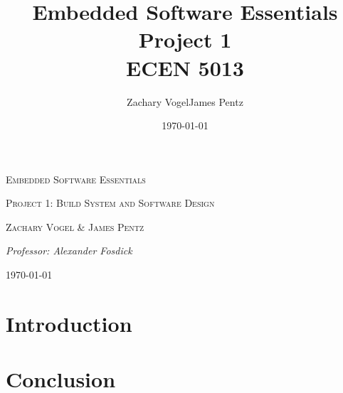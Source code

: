 \documentclass{article}
\author{Zachary Vogel\quad James Pentz}
\title{Embedded Software Essentials Project 1\\ ECEN 5013}
\date{\today}
\begin{document}
\begin{titlepage}
    \centering
    \vspace*{2cm}
    {\scshape\Huge Embedded Software Essentials \par}
    \vspace{2cm}
    {\scshape\Large Project 1: Build System and Software Design \par}
    \vspace{2.5cm}
    {\Large \scshape Zachary Vogel \& James Pentz\par}
    \vspace{1cm}
    {\large \itshape Professor: Alexander Fosdick}
    \vfill
    {\large \today\par}
\end{titlepage}

\section*{Introduction}



\section*{Conclusion}

\end{document}
